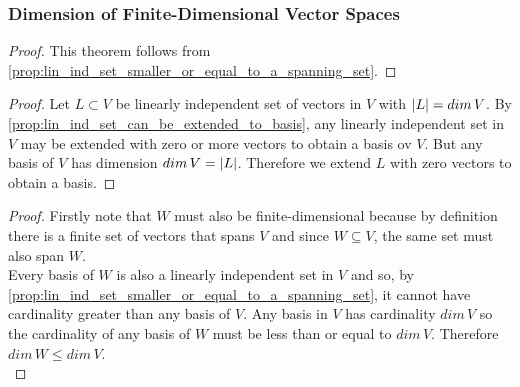 \documentclass[MathsNotesBase.tex]{subfiles}
\begin{document}
{	\medskip
	\subsubsection{Dimension of Finite-Dimensional Vector Spaces}
	
	\medskip
	\begin{proof}
		This theorem follows from \autoref{prop:lin_ind_set_smaller_or_equal_to_a_spanning_set}.
	\end{proof}

	\medskip
	\begin{proof}
		Let ${ L \subset V }$ be linearly independent set of vectors in $V$ with ${ \left\lvert L\right\rvert = dim\,V }$. By \autoref{prop:lin_ind_set_can_be_extended_to_basis}, any linearly independent set in $V$ may be extended with zero or more vectors to obtain a basis ov $V$. But any basis of $V$ has dimension ${ dim\,V = \left\lvert L\right\rvert }$. Therefore we extend $L$ with zero vectors to obtain a basis.
	\end{proof}


	\medskip
	\begin{proof}
		Firstly note that $W$ must also be finite-dimensional because by definition there is a finite set of vectors that spans $V$ and since ${ W \subseteq V }$, the same set must also span $W$.\\
		Every basis of $W$ is also a linearly independent set in $V$ and so, by \autoref{prop:lin_ind_set_smaller_or_equal_to_a_spanning_set}, it cannot have cardinality greater than any basis of $V$. Any basis in $V$ has cardinality ${ dim\,V }$ so the cardinality of any basis of $W$ must be less than or equal to ${ dim\,V }$. Therefore ${ dim\,W \leq dim\,V }$.\\
		

\end{proof}}
\end{document}
